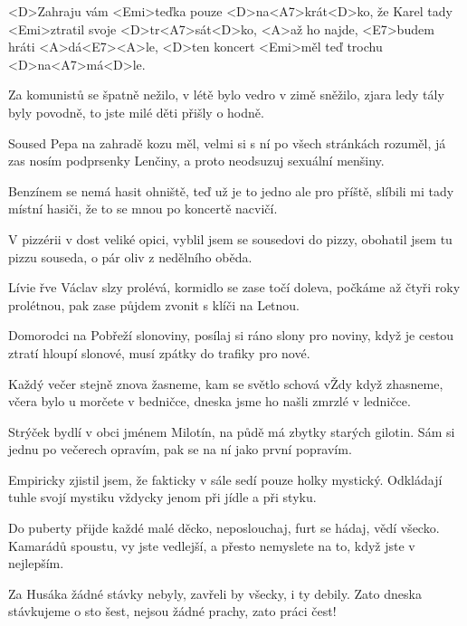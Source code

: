 

\zs
<D>Zahraju vám <Emi>teďka pouze <D>na<A7>krát<D>ko,
že Karel tady <Emi>ztratil svoje <D>tr<A7>sát<D>ko,
<A>až ho najde, <E7>budem hráti <A>dá<E7><A>le,
<D>ten koncert <Emi>měl teď trochu <D>na<A7>má<D>le.
\ks

\zs
Za komunistů se špatně nežilo,
v létě bylo vedro v zimě sněžilo,
zjara ledy tály byly povodně,
to jste milé děti přišly o hodně.
\ks

\zs
Soused Pepa na zahradě kozu měl,
velmi si s ní po všech stránkách rozuměl,
já zas nosím podprsenky Lenčiny,
a proto neodsuzuj sexuální menšiny.
\ks

\zs
Benzínem se nemá hasit ohniště,
teď už je to jedno ale pro příště,
slíbili mi tady místní hasiči,
že to se mnou po koncertě nacvičí.
\ks

\zs
V pizzérii v dost veliké opici,
vyblil jsem se sousedovi do pizzy,
obohatil jsem tu pizzu souseda,
o pár oliv z nedělního oběda.
\ks

\zs
Lívie řve Václav slzy prolévá,
kormidlo se zase točí doleva,
počkáme až čtyři roky prolétnou,
pak zase půjdem zvonit s klíči na Letnou.
\ks

\zs
Domorodci na Pobřeží slonoviny,
posílaj si ráno slony pro noviny,
když je cestou ztratí hloupí slonové,
musí zpátky do trafiky pro nové.
\ks

\zs
Každý večer stejně znova žasneme,
kam se světlo schová vŽdy když zhasneme,
včera bylo u morčete v bedničce,
dneska jsme ho našli zmrzlé v ledničce.
\ks

\zs
Strýček bydlí v obci jménem Milotín,
na půdě má zbytky starých gilotin.
Sám si jednu po večerech opravím,
pak se na ní jako první popravím.
\ks

\zs
Empiricky zjistil jsem, že fakticky
v sále sedí pouze holky mystický.
Odkládají tuhle svojí mystiku
vždycky jenom při jídle a při styku.
\ks

\zs
Do puberty přijde každé malé děcko,
neposlouchaj, furt se hádaj, vědí všecko.
Kamarádů spoustu, vy jste vedlejší,
a přesto nemyslete na to, když jste v nejlepším.
\ks

\zs
Za Husáka žádné stávky nebyly,
zavřeli by všecky, i ty debily.
Zato dneska stávkujeme o sto šest,
nejsou žádné prachy, zato práci čest!
\ks
\kp
